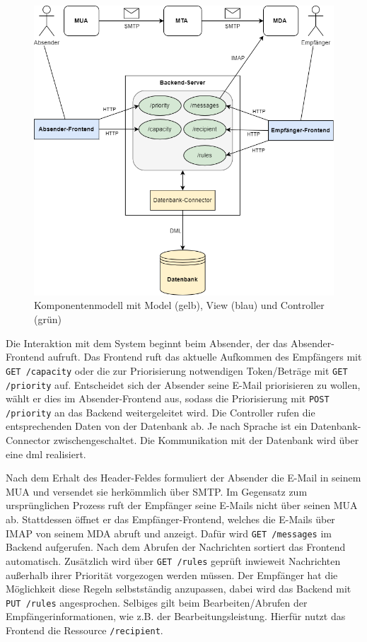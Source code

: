 \begin{figure}[!ht]
    \centering
 	\includegraphics[width=1\textwidth]{Figures/Komponentenmodell.png}
	\caption{Komponentenmodell mit Model (gelb), View (blau) und Controller (grün)}
	\label{fig:Komponentenmodell}
\end{figure}

\noindent Die Interaktion mit dem System beginnt beim Absender, der das Absender-Frontend aufruft. Das Frontend ruft das aktuelle Aufkommen des Empfängers mit \texttt{GET /capacity} oder die zur Priorisierung notwendigen Token/Beträge mit \texttt{GET /priority} auf. Entscheidet sich der Absender seine E-Mail priorisieren zu wollen, wählt er dies im Absender-Frontend aus, sodass die Priorisierung mit \texttt{POST /priority} an das Backend weitergeleitet wird. Die Controller rufen die entsprechenden Daten von der Datenbank ab. Je nach Sprache ist ein Datenbank-Connector zwischengeschaltet. Die Kommunikation mit der Datenbank wird über eine \acrfull{dml} realisiert.

Nach dem Erhalt des Header-Feldes formuliert der Absender die E-Mail in seinem MUA und versendet sie herkömmlich über SMTP. Im Gegensatz zum ursprünglichen Prozess ruft der Empfänger seine E-Mails nicht über seinen MUA ab. Stattdessen öffnet er das Empfänger-Frontend, welches die E-Mails über IMAP von seinem MDA abruft und anzeigt. Dafür wird \texttt{GET /messages} im Backend aufgerufen. Nach dem Abrufen der Nachrichten sortiert das Frontend automatisch. Zusätzlich wird über \texttt{GET /rules} geprüft inwieweit Nachrichten außerhalb ihrer Priorität vorgezogen werden müssen. Der Empfänger hat die Möglichkeit diese Regeln selbstständig anzupassen, dabei wird das Backend mit \texttt{PUT /rules} angesprochen. Selbiges gilt beim Bearbeiten/Abrufen der Empfängerinformationen, wie z.B. der Bearbeitungsleistung. Hierfür nutzt das Frontend die Ressource \texttt{/recipient}.


